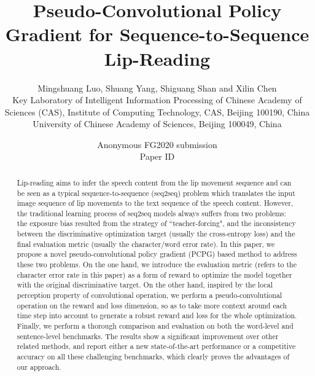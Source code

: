 \documentclass[a4paper, 10pt, conference]{ieeeconf}      \usepackage{FG2020}
\title{\LARGE \bf
Pseudo-Convolutional Policy Gradient for Sequence-to-Sequence Lip-Reading
}
\author{\parbox{16cm}{\centering
    {\large Mingshuang Luo, Shuang Yang, Shiguang Shan} and Xilin Chen\\
    {\normalsize
     Key Laboratory of Intelligent Information Processing of Chinese Academy of Sciences (CAS), Institute of Computing Technology, CAS, Beijing 100190, China\\
     University of Chinese Academy of Sciences, Beijing 100049, China }}
}
\begin{document}
\ifFGfinal
\thispagestyle{empty}
\pagestyle{empty}
\else
\author{Anonymous FG2020 submission\\ Paper ID  \\}
\pagestyle{plain}
\fi
\maketitle



\begin{abstract}

Lip-reading aims to infer the speech content from the lip movement sequence and can be seen as a typical sequence-to-sequence (seq2seq) problem which translates the input image sequence of lip movements to the text sequence of the speech content.
However, the traditional learning process of seq2seq models always suffers from two problems: the exposure bias resulted from the strategy of ``teacher-forcing", and the inconsistency between the discriminative optimization target (usually the cross-entropy loss) and the final evaluation metric (usually the character/word error rate). 
In this paper, we propose a novel pseudo-convolutional policy gradient (PCPG) based method to address these two problems.
On the one hand, we introduce the evaluation metric (refers to the character error rate in this paper) as a form of reward to optimize the model together with the original discriminative target. 
On the other hand, inspired by the local perception property of convolutional operation, we perform a pseudo-convolutional operation on the reward and loss dimension, so as to take more context around each time step into account to generate a robust reward and loss for the whole optimization.
Finally, we perform a thorough comparison and evaluation on both the word-level and sentence-level benchmarks. The results show a significant improvement over other related methods, and report either a new state-of-the-art performance or a competitive accuracy on all these challenging benchmarks, which clearly proves the advantages of our approach.

\end{abstract}
\end{document}
